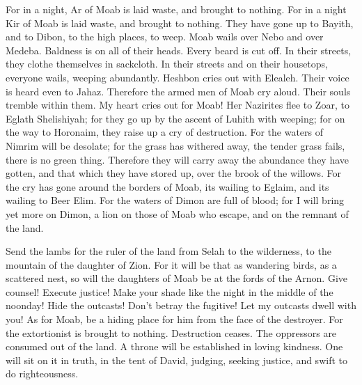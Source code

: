 \quad\quad For in a night, Ar of Moab is laid waste, and brought to nothing. For in a night Kir of Moab
is laid waste, and brought to nothing.
\myverse{}They have gone up to Bayith, and to Dibon, to the high places, to weep. Moab
wails over Nebo and over Medeba. Baldness is on all of their heads. Every beard is cut off.
\myverse{}In their streets, they clothe themselves in sackcloth. In their streets and
on their housetops, everyone wails, weeping abundantly.
\myverse{}Heshbon cries out with Elealeh. Their voice is heard even to Jahaz. Therefore
the armed men of Moab cry aloud. Their souls tremble within them.
\myverse{}My heart cries out for Moab! Her Nazirites flee to Zoar, to Eglath Shelishiyah;
for they go up by the ascent of Luhith with weeping; for on the way to Horonaim, they raise up a cry of
destruction.
\myverse{}For the waters of Nimrim will be desolate; for the grass has withered away,
the tender grass fails, there is no green thing.
\myverse{}Therefore they will carry away the abundance they have gotten, and that which
they have stored up, over the brook of the willows.
\myverse{}For the cry has gone around the borders of Moab, its wailing to Eglaim, and
its wailing to Beer Elim.
\myverse{}For the waters of Dimon are full of blood; for I will bring yet more on Dimon,
a lion on those of Moab who escape, and on the remnant of the land.


\mychapter{} \myverse*{}Send the lambs for the ruler of the land from Selah to the wilderness,
to the mountain of the daughter of Zion.
\myverse{}For it will be that as wandering birds, as a scattered nest, so will the daughters
of Moab be at the fords of the Arnon.
\myverse{}Give counsel! Execute justice! Make your shade like the night in the middle
of the noonday! Hide the outcasts! Don’t betray the fugitive!
\myverse{}Let my outcasts dwell with you! As for Moab, be a hiding place for him from
the face of the destroyer. For the extortionist is brought to nothing. Destruction ceases. The oppressors
are consumed out of the land.
\myverse{}A throne will be established in loving kindness. One will sit on it in truth,
in the tent of David, judging, seeking justice, and swift to do righteousness.

